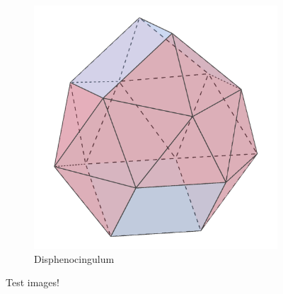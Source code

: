 \documentclass{article}
\begin{document}
\begin{figure}[h]
\begin{subfigure}{.33333\textwidth}
    \centering
    \includegraphics[width=.5\linewidth]{Disphenocingulum}
    \caption{Disphenocingulum}
    \label{fig:polyhedra_3}
  \end{subfigure}%
  \caption{Test images!}
  \label{fig:polyhedra}
\end{figure}
\end{document}
